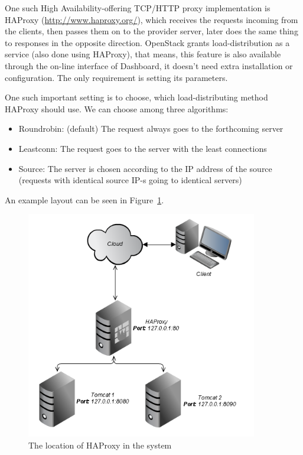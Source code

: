 \documentclass[a4paper]{article}
\begin{document}
One such High Availability-offering TCP/HTTP proxy implementation is HAProxy (\url{http://www.haproxy.org/}), which
receives the requests incoming from the clients, then passes them on to the provider server, later does the same thing to
responses in the opposite direction. OpenStack grants load-distribution as a service (also done using HAProxy), that
means, this feature is also available through the on-line interface of Dashboard, it doesn't need extra installation or
configuration. The only requirement is setting its parameters.

One such important setting is to choose, which load-distributing method HAProxy should use. We can choose among three
algorithms:
\begin{itemize}
    \item Roundrobin: (default) The request always goes to the forthcoming server
    \item Leastconn: The request goes to the server with the least connections
    \item Source: The server is chosen according to the IP address of the source (requests with identical source IP-s
          going
          to identical servers)
\end{itemize}
An example layout can be seen in Figure~\ref{fig:haproxy}.

\begin{figure}[H]
    \centering
    \includegraphics[width=0.9\textwidth]{figures/haproxy.png}
    \caption{The location of HAProxy in the system}
    \label{fig:haproxy}
\end{figure}
\end{document}
